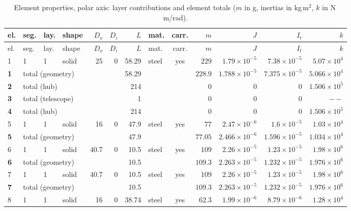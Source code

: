 \documentclass[10pt,a4paper]{article}
\numberwithin{equation}{section}
\begin{document}
\begin{longtable}{llllrrrlcrrrr}
\caption{Element properties, polar axis: layer contributions and element totals ($m$ in g, inertias in kg\,m$^2$, $k$ in N\,m/rad).}\\
\toprule
el. & seg. & lay. & shape & $D_o$ & $D_i$ & $L$ & mat. & carr. & $m$ & $J$ & $I_t$ & $k$ \\
\midrule\endfirsthead
\toprule el. & seg. & lay. & shape & $D_o$ & $D_i$ & $L$ & mat. & carr. & $m$ & $J$ & $I_t$ & $k$ \\ \midrule\endhead
1 & 1 & 1 & solid & 25 & 0 & 58.29 & steel & yes & $229$ & $1.79\times10^{-5}$ & $7.38\times10^{-5}$ & $5.07\times10^{4}$ \\
\midrule \textbf{1} & \multicolumn{5}{l}{total (geometry)} & 58.29 & & & $228.9$ & $1.788\times10^{-5}$ & $7.375\times10^{-5}$ & $5.066\times10^{4}$ \\ \midrule
\midrule \textbf{2} & \multicolumn{5}{l}{total (hub)} & 214 & & & $0$ & $0$ & $0$ & $1.506\times10^{5}$ \\ \midrule
\midrule \textbf{3} & \multicolumn{5}{l}{total (telescope)} & 1 & & & $0$ & $0$ & $0$ & $--$ \\ \midrule
\midrule \textbf{4} & \multicolumn{5}{l}{total (hub)} & 214 & & & $0$ & $0$ & $0$ & $1.506\times10^{5}$ \\ \midrule
5 & 1 & 1 & solid & 16 & 0 & 47.9 & steel & yes & $77$ & $2.47\times10^{-6}$ & $1.6\times10^{-5}$ & $1.03\times10^{4}$ \\
\midrule \textbf{5} & \multicolumn{5}{l}{total (geometry)} & 47.9 & & & $77.05$ & $2.466\times10^{-6}$ & $1.596\times10^{-5}$ & $1.034\times10^{4}$ \\ \midrule
6 & 1 & 1 & solid & 40.7 & 0 & 10.5 & steel & yes & $109$ & $2.26\times10^{-5}$ & $1.23\times10^{-5}$ & $1.98\times10^{6}$ \\
\midrule \textbf{6} & \multicolumn{5}{l}{total (geometry)} & 10.5 & & & $109.3$ & $2.263\times10^{-5}$ & $1.232\times10^{-5}$ & $1.976\times10^{6}$ \\ \midrule
7 & 1 & 1 & solid & 40.7 & 0 & 10.5 & steel & yes & $109$ & $2.26\times10^{-5}$ & $1.23\times10^{-5}$ & $1.98\times10^{6}$ \\
\midrule \textbf{7} & \multicolumn{5}{l}{total (geometry)} & 10.5 & & & $109.3$ & $2.263\times10^{-5}$ & $1.232\times10^{-5}$ & $1.976\times10^{6}$ \\ \midrule
8 & 1 & 1 & solid & 16 & 0 & 38.74 & steel & yes & $62.3$ & $1.99\times10^{-6}$ & $8.79\times10^{-6}$ & $1.28\times10^{4}$ \\

\end{longtable}
\end{document}
